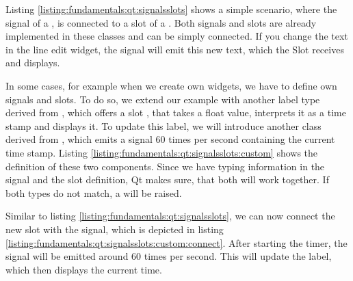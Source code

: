Listing \ref{listing:fundamentals:qt:signalsslots} shows a simple scenario,
where the signal of a , is connected to
a slot of a . Both signals and slots are
already implemented in these classes and can be simply connected. If you change
the text in the line edit widget, the signal 
will emit this new text, which the Slot  receives
and displays.



In some cases, for example when we create own widgets, we have to define own
signals and slots. To do so, we extend our example with another label type
 derived from
, which offers a slot
, that takes a float value, interprets it as a time
stamp and displays it. To update this label, we will introduce another class
 derived from ,
which emits a signal 60 times per second containing the current time stamp.
Listing \ref{listing:fundamentals:qt:signalsslots:custom} shows the definition
of these two components. Since we have typing information in the signal and the
slot definition, Qt makes sure, that both will work together. If both types do
not match, a  will be raised.



Similar to listing \ref{listing:fundamentals:qt:signalsslots}, we can now
connect the new slot with the signal, which is depicted in listing
\ref{listing:fundamentals:qt:signalsslots:custom:connect}. After starting the
timer, the signal will be emitted around 60 times per second. This will update
the label, which then displays the current time.



